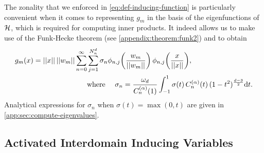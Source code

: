 The zonality that we enforced in \cref{eq:def-inducing-function} is particularly convenient when it comes to representing $g_m$ in the basis of the eigenfunctions of ${\mathcal{H}}$, which is required for computing inner products. It indeed allows us to make use of the Funk-Hecke theorem (see \cref{appendix:theorem:funk2}) and to obtain
\begin{equation}
\begin{aligned}
\label{eq:fourier-decomposition-activation-functions-new}
    g_m(x) = \norm{x}\, \norm{w_m} \sum_{n=0}^\infty &\sum_{j=1}^{\dnumharmonicsforlevel}  \sigma_n \phi_{n, j}\left(\frac{w_m}{\norm{w_m}}\right)\, \phi_{n, j}\left(\frac{x}{\norm{x}}\right), \\
   & \text{where \quad} \sigma_{n} = 
   \frac{\omega_{d}}{C_n^{(\alpha)}(1)} \int_{-1}^1 \sigma(t)\,C_n^{(\alpha)}(t)\,(1 - t^2)^{\frac{d-3}{2}} \calcd{t}.
\end{aligned}
\end{equation}
Analytical expressions for $\sigma_n$ when $\sigma(t)=\max(0, t)$ are given in \cref{app:sec:compute-eigenvalues}.





\subsection{Activated Interdomain Inducing Variables}
\label{sec:relu-inducing-variables}

